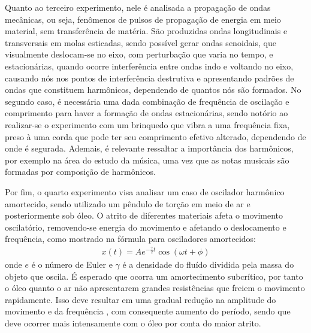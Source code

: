 Quanto ao terceiro experimento, nele é analisada a propagação de ondas mecânicas, ou seja, fenômenos de pulsos de propagação de energia em meio material, sem transferência de matéria. São produzidas ondas longitudinais e transversais em molas esticadas, sendo possível gerar ondas senoidais, que visualmente deslocam-se no eixo, com perturbação que varia no tempo, e estacionárias, quando ocorre interferência entre ondas indo e voltando no eixo, causando nós nos pontos de interferência destrutiva e apresentando padrões de ondas que constituem harmônicos, dependendo de quantos nós são formados. No segundo caso, é necessária uma dada combinação de frequência de oscilação e comprimento para haver a formação de ondas estacionárias, sendo notório ao realizar-se o experimento com um brinquedo que vibra a uma frequência fixa, preso à uma corda que pode ter seu comprimento efetivo alterado, dependendo de onde é segurada. Ademais, é relevante ressaltar a importância dos harmônicos, por exemplo na área do estudo da música, uma vez que as notas musicais são formadas por composição de harmônicos.

Por fim, o quarto experimento visa analisar um caso de oscilador harmônico amortecido, sendo utilizado um pêndulo de torção em meio de ar e posteriormente sob óleo. O atrito de diferentes materiais afeta o movimento oscilatório, removendo-se energia do movimento e afetando o deslocamento e frequência, como mostrado na fórmula para osciladores amortecidos:
\begin{align*}
	x(t) = Ae^{-\frac{\gamma}{2}t}\cos{(\omega t + \phi)}
\end{align*}
onde \(e\) é o número de Euler e \(\gamma\) é a densidade do fluído dividida pela massa do objeto que oscila. É esperado que ocorra um amortecimento subcrítico, por tanto o óleo quanto o ar não apresentarem grandes resistências que freiem o movimento rapidamente. Isso deve resultar em uma gradual redução na amplitude do movimento e da frequência \cite{Nussenzveig_2014}, com consequente aumento do período, sendo que deve ocorrer mais intensamente com o óleo por conta do maior atrito.

